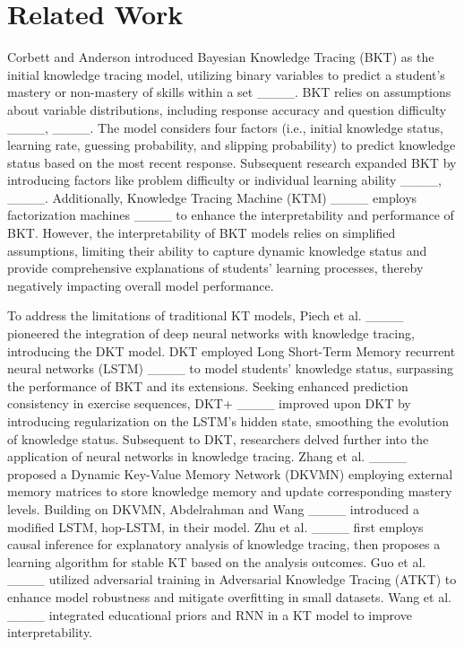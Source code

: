 \section{Related Work}
Corbett and Anderson introduced Bayesian Knowledge Tracing (BKT) as the initial knowledge tracing model, utilizing binary variables to predict a student's mastery or non-mastery of skills within a set ____. BKT relies on assumptions about variable distributions, including response accuracy and question difficulty ____, ____. The model considers four factors (i.e., initial knowledge status, learning rate, guessing probability, and slipping probability) to predict knowledge status based on the most recent response. Subsequent research expanded BKT by introducing factors like problem difficulty or individual learning ability ____, ____. Additionally, Knowledge Tracing Machine (KTM) ____ employs factorization machines ____ to enhance the interpretability and performance of BKT. However, the interpretability of BKT models relies on simplified assumptions, limiting their ability to capture dynamic knowledge status and provide comprehensive explanations of students' learning processes, thereby negatively impacting overall model performance.

To address the limitations of traditional KT models, Piech et al. ____ pioneered the integration of deep neural networks with knowledge tracing, introducing the DKT model. DKT employed Long Short-Term Memory recurrent neural networks (LSTM) ____ to model students' knowledge status, surpassing the performance of BKT and its extensions. Seeking enhanced prediction consistency in exercise sequences, DKT+ ____ improved upon DKT by introducing regularization on the LSTM's hidden state, smoothing the evolution of knowledge status. Subsequent to DKT, researchers delved further into the application of neural networks in knowledge tracing. Zhang et al. ____ proposed a Dynamic Key-Value Memory Network (DKVMN) employing external memory matrices to store knowledge memory and update corresponding mastery levels. Building on DKVMN, Abdelrahman and Wang ____ introduced a modified LSTM, hop-LSTM, in their model. Zhu et al. ____ first employs causal inference for explanatory analysis of knowledge tracing, then proposes a learning algorithm for stable KT based on the analysis outcomes. Guo et al. ____ utilized adversarial training in Adversarial Knowledge Tracing (ATKT) to enhance model robustness and mitigate overfitting in small datasets. Wang et al. ____ integrated educational priors and RNN in a KT model to improve interpretability.


